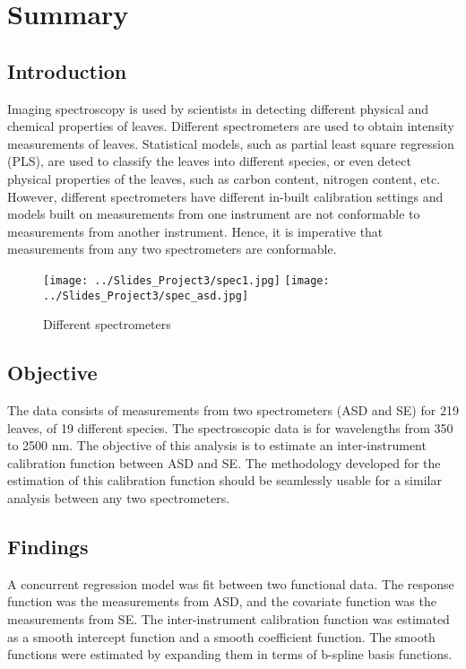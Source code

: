 \section*{Summary} \label{Sec_Summary}
\subsection*{Introduction}
Imaging spectroscopy is used by scientists in detecting different physical and chemical properties of leaves. Different spectrometers are used to obtain intensity measurements of leaves. Statistical models, such as partial least square regression (PLS), are used to classify the leaves into different species, or even detect physical properties of the leaves, such as carbon content, nitrogen content, etc. However, different spectrometers have different in-built calibration settings and models built on measurements from one instrument are not conformable to measurements from another instrument. Hence, it is imperative that measurements from any two spectrometers are conformable. 

\begin{figure}[H]
\centering
\texttt{[image: ../Slides\_Project3/spec1.jpg]}
\hspace{1cm}
\texttt{[image: ../Slides\_Project3/spec\_asd.jpg]}
\caption{Different spectrometers}
\label{fig:Fig1.1}
\end{figure}

\subsection*{Objective}
The data consists of measurements from two spectrometers (ASD and SE) for 219 leaves, of 19 different species. The spectroscopic data is for wavelengths from 350 to 2500 nm. The objective of this analysis is to estimate an inter-instrument calibration function between ASD and SE. The methodology developed for the estimation of this calibration function should be seamlessly usable for a similar analysis between any two spectrometers. 

\subsection*{Findings}
A concurrent regression model was fit between two functional data. The response function was the measurements from ASD, and the covariate function was the measurements from SE. The inter-instrument calibration function was estimated as a smooth intercept function and a smooth coefficient function. The smooth functions were estimated by expanding them in terms of b-spline basis functions. 
